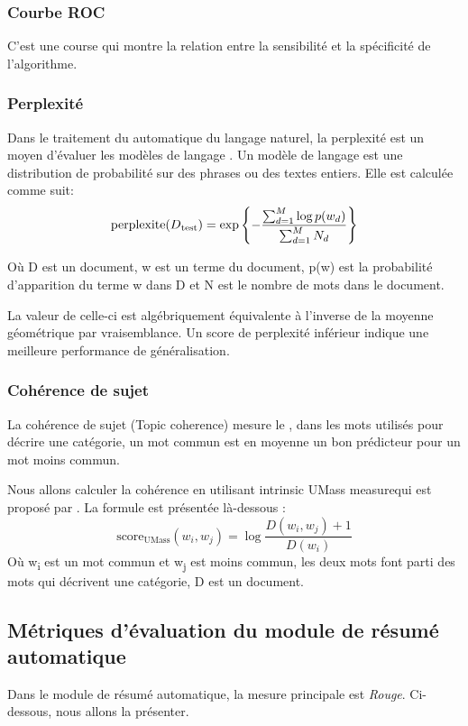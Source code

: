         \subsubsection{Courbe ROC} 
        C'est une course qui montre la relation entre la sensibilité et la spécificité de l'algorithme.
        
        \subsubsection{Perplexité}
        Dans le traitement du automatique du langage naturel, la perplexité est un moyen d'évaluer les modèles de langage \cite{perplexite}. Un modèle de langage est une distribution de probabilité sur des phrases ou des textes entiers. Elle est calculée comme suit:
        \[
        \text{perplexite}(D\textsubscript{test}) =
        \exp
        \left \{-\frac{\sum_{d=1}^{M}{\log{p(w_d)}}}{\sum_{d=1}^{M}{N_d}}\right\}
        \]

        Où D est un document, w est un terme du document, p(w) est la probabilité d'apparition du terme w dans D et N est le nombre de mots dans le document.

        La valeur de celle-ci est algébriquement équivalente à l'inverse de la moyenne géométrique par vraisemblance. Un score de perplexité inférieur indique une meilleure performance de généralisation.

        \subsubsection{Cohérence de sujet}
        La cohérence de sujet (Topic coherence) mesure le , dans les mots utilisés pour décrire une catégorie, un mot commun est en moyenne un bon prédicteur pour un mot moins commun.

        Nous allons calculer la cohérence en utilisant \textquotedbl intrinsic UMass measure\textquotedbl qui est proposé par \cite{perplexite}. La formule est présentée là-dessous :
        \[
        \text{score}_{\text{UMass}}(w_i, w_j) =
        \log
        \frac{D(w_i, w_j) + 1}{D(w_i)}
        \]
        Où w\textsubscript{i} est un mot commun et w\textsubscript{j} est moins commun, les deux mots font parti des mots qui décrivent une catégorie, D est un document.

    \subsection{Métriques d'évaluation du module de résumé automatique}
    Dans le module de résumé automatique, la mesure principale est \emph{Rouge}. Ci-dessous, nous allons la présenter.

